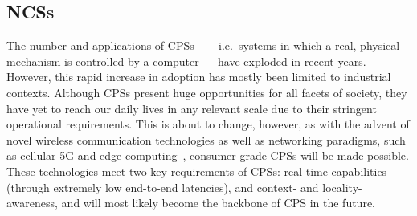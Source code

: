 %
%

\subsection{\acsp{NCS}}\label{background:ncs}

The number and applications of \glspl{CPS}~\cite{Rajkumar2010CPS} --- i.e.\ systems in which a real, physical mechanism is controlled by a computer --- have exploded in recent years.
However, this rapid increase in adoption has mostly been limited to industrial contexts.
Although \glspl{CPS} present huge opportunities for all facets of society, they have yet to reach our daily lives in any relevant scale due to their stringent operational requirements.
This is about to change, however, as with the advent of novel wireless communication technologies as well as networking paradigms, such as cellular 5G and edge computing~\cite{Satya2017Emergence}, consumer-grade \glspl{CPS} will be made possible.
These technologies meet two key requirements of \glspl{CPS}: real-time capabilities (through extremely low end-to-end latencies), and context- and locality-awareness, and will most likely become the backbone of \gls{CPS} in the future.

